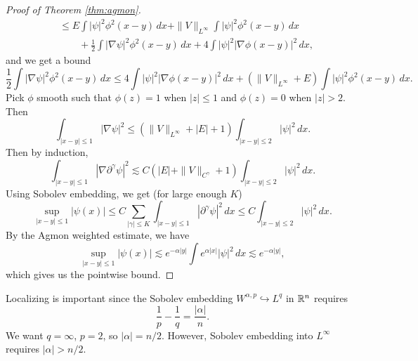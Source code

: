 \begin{proof}[Proof of Theorem \ref{thm:agmon}]
\begin{align*}
    &\le E \int |\psi|^2 \phi^2(x - y)\, dx
    + \|V\|_{L^\infty} \int |\psi|^2 \phi^2(x - y)\, dx \\
    &\quad \quad + \frac{1}{2} \int |\nabla \psi|^2 \phi^2(x - y)\, dx
    + 4 \int |\psi|^2 |\nabla \phi(x - y)|^2\, dx,
  \end{align*}
  and we get a bound
  \[
    \frac{1}{2} \int |\nabla \psi|^2 \phi^2(x - y)\, dx
    \le 4 \int |\psi|^2 |\nabla \phi(x - y)|^2\, dx
    + (\|V\|_{L^\infty} + E) \int |\psi|^2 \phi^2(x - y)\, dx.
  \]
  Pick $\phi$ smooth such that $\phi(z) = 1$ when
  $|z| \le 1$ and $\phi(z) = 0$ when $|z| > 2$. Then
  \[
    \int_{|x - y| \le 1} |\nabla \psi|^2
    \le (\|V\|_{L^\infty} + |E| + 1) \int_{|x - y| \le 2} |\psi|^2\, dx.
  \]
  Then by induction,
  \[
    \int_{|x - y| \le 1} |\nabla \partial^\gamma \psi|^2 \lesssim C(|E| + \|V\|_{C^\gamma} + 1)
    \int_{|x - y| \le 2} |\psi|^2\, dx.
  \]
  Using Sobolev embedding, we get (for large enough $K$)
  \[
    \sup_{|x - y| \le 1} |\psi(x)| \le
    C \sum_{|\gamma| \le K} \int_{|x - y| \le 1} |\partial^\gamma \psi|^2\, dx
    \le C \int_{|x - y| \le 2} |\psi|^2\, dx.
  \]
  By the Agmon weighted estimate, we have
  \[
    \sup_{|x - y| \le 1} |\psi(x)| \lesssim
    e^{-\alpha|y|} \int e^{\alpha |x|} |\psi|^2\, dx
    \lesssim e^{-\alpha |y|},
  \]
  which gives us the pointwise bound.
\end{proof}

\begin{remark}
  Localizing is important since
  the Sobolev embedding $W^{\alpha, p} \hookrightarrow L^q$
  in $\mathbb{R}^n$
  requires
  \[
    \frac{1}{p} - \frac{1}{q} = \frac{|\alpha|}{n}.
  \]
  We want $q = \infty$, $p = 2$, so $|\alpha| = n / 2$.
  However, Sobolev embedding
  into $L^\infty$ requires $|\alpha| > n / 2$.
\end{remark}
